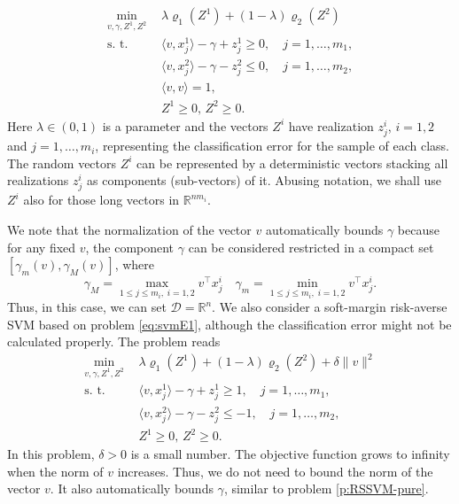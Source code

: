 \documentclass[10pt,letterpaper]{article}
\newcommand{\R}{\mathbb{R}}
\newcommand{\Dc}{\mathcal{D}}
\newcommand{\1}{1{\hskip -2.55 pt}\hbox{I}}
\begin{document}
\begin{equation}
\label{p:RSSVM-pure}
\begin{aligned}
\min_{v,\gamma,Z^1,Z^2}\ &\,  \lambda\varrho_1(Z^1) + (1-\lambda)\varrho_2(Z^2)\\
\text{s. t. } &\, \langle v, x^1_j\rangle - \gamma + z_j^1 \ge 0, \quad j=1,\dots,m_1,\\
&\, \langle v, x^2_{j}\rangle -\gamma  - z_{j}^2 \le 0, \quad j=1,\dots,m_2,\\
&\, \langle v,v\rangle =1,\\
&\, Z^1\ge 0,\, Z^2\geq 0.
\end{aligned}
\end{equation}
Here $\lambda\in (0,1)$ is a parameter and 
the vectors $Z^i$ have realization $z_j^i$, $i=1,2$ and $j=1,\dots, m_i$, representing the classification error for the sample of each class. The random vectors $Z^i$ can be represented by a deterministic vectors stacking all realizations $z_j^i$ as components (sub-vectors) of it. Abusing notation, we shall use $Z^i$ also for those long vectors in $\mathbb R^{nm_i}$.  

We note that  the normalization of  the vector $v$ automatically bounds $\gamma$ because for any fixed $v$,
the component $\gamma$ can be considered restricted in a compact set $[\gamma_m(v), \gamma_M(v)] $, where 
\[
\gamma_M = \max_{1\leq j\leq m_i,\; i=1,2} v^\top x^i_j\quad  \gamma_m =\min_{1\leq j\leq m_i,\; i=1,2} v^\top x^i_j.
\]
Thus, in this case, we can set $\Dc=\R^n.$
We also consider a soft-margin risk-averse SVM based on problem \eqref{eq:svmE1}, although the classification error might not be calculated properly.
The problem reads
\begin{equation}
\label{p:RSSVM}
\begin{aligned}
\min_{v,\gamma,Z^1,Z^2}\ &\,  \lambda\varrho_1(Z^1) + (1-\lambda)\varrho_2(Z^2) +\delta\|v\|^2\\
\text{s. t. } &\, \langle v, x^1_j\rangle - \gamma + z_j^1 \ge 1, \quad j=1,\dots,m_1,\\
&\, \langle v, x^2_{j}\rangle -\gamma  - z_{j}^2 \le -1, \quad j=1,\dots,m_2,\\
&\, Z^1\ge 0,\, Z^2\geq 0.
\end{aligned}
\end{equation}
In this problem, $\delta>0$ is a small number. The objective function grows to infinity when the norm of $v$ increases.  Thus, we do not need to bound the norm of the vector $v$. It also automatically bounds $\gamma$, similar to problem \eqref{p:RSSVM-pure}.
\end{document}
